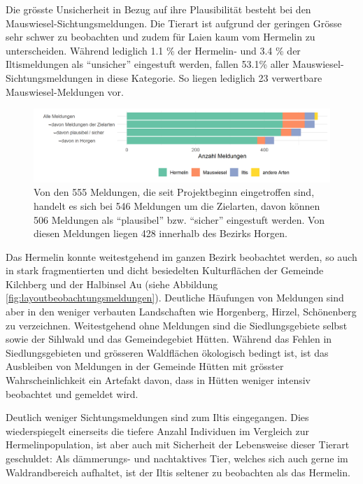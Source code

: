 \documentclass[
  oneside]{scrbook}
\begin{document}
Die grösste Unsicherheit in Bezug auf ihre Plausibilität besteht bei den Mauswiesel-Sichtungsmeldungen. Die Tierart ist aufgrund der geringen Grösse sehr schwer zu beobachten und zudem für Laien kaum vom Hermelin zu unterscheiden. Während lediglich 1.1 \% der Hermelin- und 3.4 \% der Iltismeldungen als ``unsicher'' eingestuft werden, fallen 53.1\% aller Mauswiesel-Sichtungsmeldungen in diese Kategorie. So liegen lediglich 23 verwertbare Mauswiesel-Meldungen vor.



\begin{figure}
\includegraphics[width=1\linewidth]{images/beobachtungsmeldungen_filter} \caption{Von den 555 Meldungen, die seit Projektbeginn eingetroffen sind, handelt es sich bei 546 Meldungen um die Zielarten, davon können 506 Meldungen als ``plausibel'' bzw. ``sicher'' eingestuft werden. Von diesen Meldungen liegen 428 innerhalb des Bezirks Horgen.}\label{fig:beobachtungsmeldungenfilter}
\end{figure}

Das Hermelin konnte weitestgehend im ganzen Bezirk beobachtet werden, so auch in stark fragmentierten und dicht besiedelten Kulturflächen der Gemeinde Kilchberg und der Halbinsel Au (siehe Abbildung \ref{fig:layoutbeobachtungsmeldungen}). Deutliche Häufungen von Meldungen sind aber in den weniger verbauten Landschaften wie Horgenberg, Hirzel, Schönenberg zu verzeichnen. Weitestgehend ohne Meldungen sind die Siedlungsgebiete selbst sowie der Sihlwald und das Gemeindegebiet Hütten. Während das Fehlen in Siedlungsgebieten und grösseren Waldflächen ökologisch bedingt ist, ist das Ausbleiben von Meldungen in der Gemeinde Hütten mit grösster Wahrscheinlichkeit ein Artefakt davon, dass in Hütten weniger intensiv beobachtet und gemeldet wird.

Deutlich weniger Sichtungsmeldungen sind zum Iltis eingegangen. Dies wiederspiegelt einerseits die tiefere Anzahl Individuen im Vergleich zur Hermelinpopulation, ist aber auch mit Sicherheit der Lebensweise dieser Tierart geschuldet: Als dämmerungs- und nachtaktives Tier, welches sich auch gerne im Waldrandbereich aufhaltet, ist der Iltis seltener zu beobachten als das Hermelin.
\end{document}
